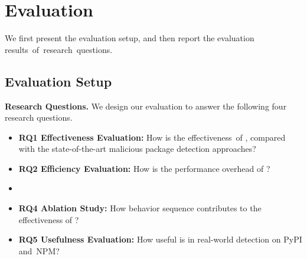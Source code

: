 
\section{Evaluation}\label{sec:evaluation}

We first present the evaluation setup, and then report the evaluation results~of~research~questions.

\subsection{Evaluation Setup}




\textbf{Research Questions.} We design our evaluation to answer the following four research questions.

\begin{itemize}[leftmargin=*]
    \item \textbf{RQ1 Effectiveness Evaluation:} How is the effectiveness~of \tool, compared with the state-of-the-art malicious package detection approaches?
    \item \textbf{RQ2 Efficiency Evaluation:} How is the performance overhead of \tool?%
    \item {}
    \item \textbf{RQ4 Ablation Study:} How behavior sequence contributes to the effectiveness of \tool?
    \item \textbf{RQ5 Usefulness Evaluation:} How useful is \tool in real-world detection on PyPI and~NPM?
\end{itemize}




